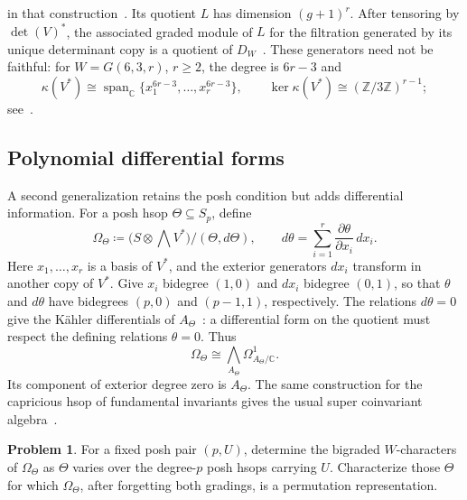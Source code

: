 \documentclass[10pt,a4paper]{amsart}
\newcommand{\defeq}{\coloneqq}
\theoremstyle{definition}
\newtheorem{problem}[theorem]{Problem}
\newcommand{\C}{\mathbb C}\newcommand{\Q}{\mathbb Q}
\newcommand{\Z}{\mathbb Z}\newcommand{\N}{\mathbb Z_{\ge0}}
\begin{document}
\begin{itemize}
in that construction~\cite[Theorem~1.2 and Section~3R]{GriffethDiagonal}.
Its quotient $L$ has dimension $(g+1)^r$. After tensoring by
$\det(V)^*$, the associated graded module of $L$ for the filtration
generated by its unique determinant copy is a quotient of
$D_W$~\cite[Lemma~3.1]{GriffethDiagonal}.
These generators need not be faithful: for $W=G(6,3,r)$, $r\geq2$,
the degree is $6r-3$ and
\[
 \kappa(V^*)\cong\operatorname{span}_{\C}\{x_1^{6r-3},\ldots,x_r^{6r-3}\},
 \qquad \ker\kappa(V^*)\cong(\Z/3\Z)^{r-1};
\]
see~\cite[Section~8]{EquivariantParameters}.
\end{itemize}

\subsection{Polynomial differential forms}

A second generalization retains the posh condition but adds differential
information. For a posh hsop $\Theta\subseteq S_p$, define
\[
 \Omega_\Theta\defeq
 \bigl(S\otimes\textstyle\bigwedge V^*\bigr)/(\Theta,d\Theta),
 \qquad
 d\theta=\sum_{i=1}^r
       \frac{\partial\theta}{\partial x_i}\,dx_i.
\]
Here $x_1,\ldots,x_r$ is a basis of $V^*$, and the exterior generators
$dx_i$ transform in another copy of $V^*$.
Give $x_i$ bidegree $(1,0)$ and $dx_i$ bidegree $(0,1)$, so that $\theta$ and $d\theta$ have bidegrees $(p,0)$ and
$(p-1,1)$, respectively. 
The relations $d\theta=0$ give the K\"ahler differentials of
$A_\Theta$~\cite[Tag~00RU]{Stacks}: a differential form on the quotient
must respect the defining relations $\theta=0$. Thus
\[
 \Omega_\Theta\cong
 \textstyle\bigwedge_{A_\Theta}\Omega^1_{A_\Theta/\C}.
\]
Its component of exterior degree zero is $A_\Theta$. The same construction for the capricious hsop of
fundamental invariants gives the usual super coinvariant
algebra~\cite[Section~5]{SwansonWallachForms}.

\begin{problem}\label{prob:differential-parking}
For a fixed posh pair $(p,U)$, determine the bigraded $W$-characters
of $\Omega_\Theta$ as $\Theta$ varies over the degree-$p$ posh hsops
carrying $U$. Characterize those $\Theta$ for which $\Omega_\Theta$,
after forgetting both gradings, is a permutation representation.
\end{problem}
\end{document}
